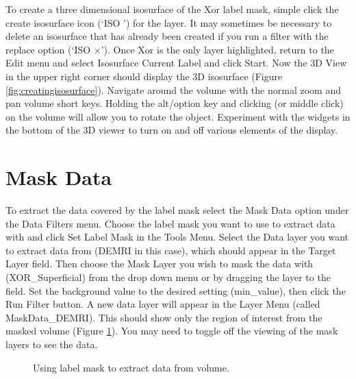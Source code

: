\documentclass[fleqn,11pt,openany]{book}
\begin{document}
To create a three dimensional isosurface of the Xor label mask, simple click the create isosurface icon 
 (`ISO \Forward') for the layer.  It may sometimes be necessary to delete an isosurface that has already been created if you run a filter with the replace option  (`ISO $\times$').  Once Xor is the only layer highlighted, return to the Edit menu and select Isosurface Current Label and click Start.  Now the 3D View in the upper right corner should display the 3D isosurface (Figure \ref{fig:creatingisosurface}).  Navigate around the volume with the normal zoom and pan volume short keys.  Holding the alt/option key and clicking (or middle click) on the volume will allow you to rotate the object.  Experiment with the widgets in the bottom of the 3D viewer to turn on and off various elements of the display.



\section{Mask Data}

To extract the data covered by the label mask select the Mask Data option under the Data Filters menu.  Choose the label mask you want to use to extract data with and click Set Label Mask in the Tools Menu.  Select the Data layer you want to extract data from (DEMRI in this case), which should appear in the Target Layer field.  Then choose the Mask Layer you wish to mask the data with (XOR\_Superficial) from the drop down menu or by dragging the layer to the field.  Set the background value to the desired setting (min\_value), then click the Run Filter button.  A new data layer will appear in the Layer Menu (called MaskData\_DEMRI).  This should show only the region of interest from the masked volume (Figure \ref{fig:maskdata}).  You may need to toggle off the viewing of the mask layers to see the data.

\begin{figure}
\caption{Using label mask to extract data from volume.}\label{fig:maskdata}
\end{figure}
\end{document}
